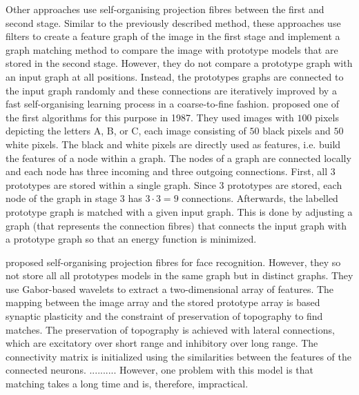 Other approaches use self-organising projection fibres between the first and second stage. Similar to the previously described method, these approaches use filters to create a feature graph of the image in the first stage and implement a graph matching method to compare the image with prototype models that are stored in the second stage. However, they do not compare a prototype graph with an input graph at all positions. Instead, the prototypes graphs are connected to the input graph randomly and these connections are iteratively improved by a fast self-organising learning process in a coarse-to-fine fashion.
 proposed one of the first algorithms for this purpose in 1987. They used images with $100$ pixels depicting the letters A, B, or C, each image consisting of $50$ black pixels and $50$ white pixels. The black and white pixels are directly used as features, i.e. build the features of a node within a graph. The nodes of a graph are connected locally and each node has three incoming and three outgoing connections. 
First, all $3$ prototypes are stored within a single graph. Since $3$ prototypes are stored, each node of the graph in stage $3$ has $3 \cdot 3 = 9$ connections. Afterwards, the labelled prototype graph is matched with a given input graph. This is done by adjusting a graph (that represents the connection fibres) that connects the input graph with a prototype graph so that an energy function is minimized. 

 proposed self-organising projection fibres for face recognition. However, they so not store all all prototypes models in the same graph but in distinct graphs. They use Gabor-based wavelets to extract a two-dimensional array of features. The mapping between the image array and the stored prototype array is based synaptic plasticity and the constraint of preservation of topography to find matches. The preservation of topography is achieved with lateral connections, which are excitatory over short range and inhibitory over long range.
The connectivity matrix is initialized using the similarities between the features of the connected neurons. ..........
However, one problem with this model is that matching takes a long time and is, therefore, impractical.

